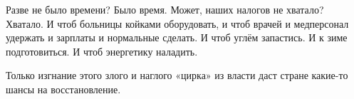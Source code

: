Разве не было времени? Было время. Может, наших налогов не хватало? Хватало. И
чтоб больницы койками оборудовать, и чтоб врачей и медперсонал удержать и
зарплаты и нормальные сделать. И чтоб углём запастись. И к зиме подготовиться.
И чтоб энергетику наладить. 

Только изгнание этого злого и наглого «цирка» из власти даст стране какие-то
шансы на восстановление.

